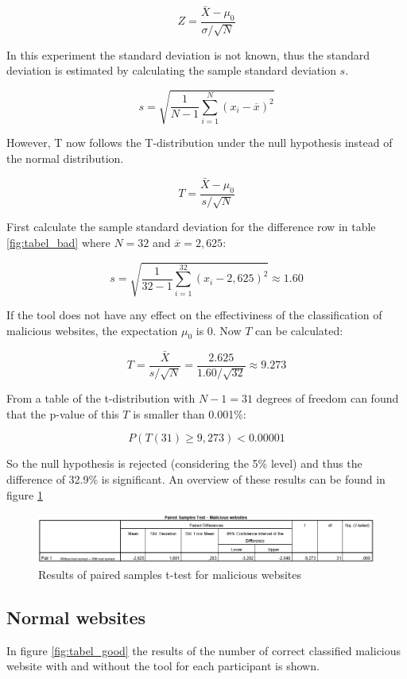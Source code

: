 \documentclass[twoside,openright,notitlepage]{uva-bachelor-thesis}
\begin{document}
$$Z=\frac{\bar{X}-\mu_0}{\sigma/\sqrt{N}}$$

In this experiment the standard deviation is not known, thus the standard deviation is estimated by calculating the sample standard deviation $s$.

$$s = \sqrt{\frac{1}{N-1} \sum_{i=1}^N (x_i - \overline{x})^2}$$

However, T now follows the T-distribution under the null hypothesis instead of the normal distribution.

$$T=\frac{\bar{X}-\mu_0}{s/\sqrt{N}}$$

First calculate the sample standard deviation for the difference row in table \ref{fig:tabel_bad} where $N = 32$ and $\overline{x} = 2,625$:

$$s = \sqrt{\frac{1}{32-1} \sum_{i=1}^32 (x_i - 2,625)^2} \approx 1.60$$

If the tool does not have any effect on the effectiviness of the classification of malicious websites, the expectation $\mu_0$ is 0. Now $T$ can be calculated:

$$T=\frac{\bar{X}}{s/\sqrt{N}} = \frac{2.625}{1.60/\sqrt{32}} \approx 9.273$$

From a table of the t-distribution with $N - 1 = 31$ degrees of freedom can found that the p-value of this $T$ is smaller than 0.001\%:

$$ P(T(31) \ge 9{,}273) < 0.00001 $$

So the null hypothesis is rejected (considering the 5\% level) and thus the difference of 32.9\% is significant. An overview of these results can be found in figure \ref{fig:tabel_bad_results}

\begin{figure}[h!]
    \centering
    \includegraphics[width=1.2\textwidth, center]{img/tabel_bad_results.PNG}
    \caption{Results of paired samples t-test for malicious websites}
    \label{fig:tabel_bad_results}
\end{figure}


\FloatBarrier
\subsection{Normal websites}
In figure \ref{fig:tabel_good} the results of the number of correct classified malicious website with and without the tool for each participant is shown.\\
\end{document}
